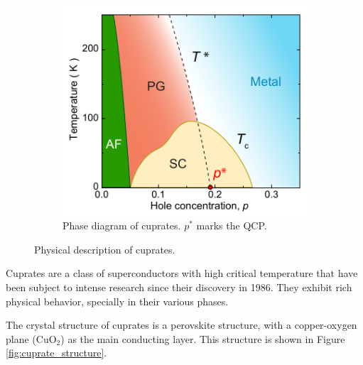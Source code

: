 \begin{figure}
\begin{subfigure}{0.48\textwidth}
        \includegraphics[width=\textwidth]{figures/phase_diagram}
        \caption{Phase diagram of cuprates. $p^*$ marks the QCP.}
        \label{fig:phase_diagram}
    \end{subfigure}
    \caption{Physical description of cuprates.}
\end{figure}

Cuprates are a class of superconductors with high critical temperature that have been subject
to intense research since their discovery in 1986. They exhibit rich physical behavior, specially
in their various phases.

The crystal structure of cuprates is a perovskite structure, with a copper-oxygen plane
($\mathrm{CuO}_2$) as the main conducting layer. This structure is shown in Figure
\ref{fig:cuprate_structure}.